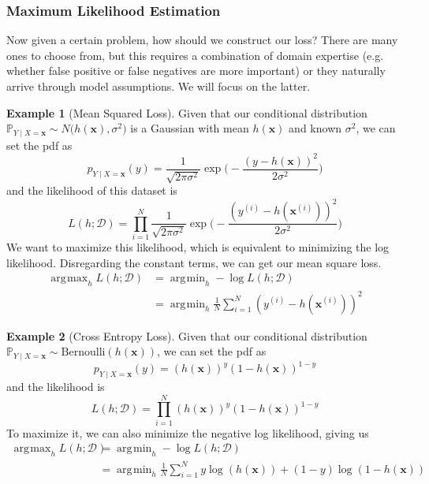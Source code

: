 \documentclass{article}
\DeclareMathOperator*{\argmin}{\arg\!\min}
\DeclareMathOperator*{\argmax}{\arg\!\max}
\theoremstyle{definition}
\newtheorem{example}{Example}[section]
\begin{document}
    \subsubsection{Maximum Likelihood Estimation}

    Now given a certain problem, how should we construct our loss? There are many ones to choose from, but this requires a combination of domain expertise (e.g. whether false positive or false negatives are more important) or they naturally arrive through model assumptions. We will focus on the latter. 

    \begin{example}[Mean Squared Loss]
      Given that our conditional distribution $\mathbb{P}_{Y \mid X = \mathbf{x}} \sim N\big( h(\mathbf{x}), \sigma^2)$ is a Gaussian with mean $h(\mathbf{x})$ and known $\sigma^2$, we can set the pdf as 
      \[p_{Y \mid X = \mathbf{x}} (y) = \frac{1}{\sqrt{2\pi \sigma^2}} \exp \bigg( -\frac{ (y - h(\mathbf{x}))^2}{2 \sigma^2} \bigg) \]
      and the likelihood of this dataset is 
      \[L(h; \mathcal{D}) = \prod_{i=1}^N \frac{1}{\sqrt{2\pi \sigma^2}} \exp \bigg( -\frac{ (y^{(i)} - h(\mathbf{x}^{(i)}))^2}{2 \sigma^2} \bigg)\]
      We want to maximize this likelihood, which is equivalent to minimizing the log likelihood. Disregarding the constant terms, we can get our mean square loss. 
      \begin{align*}
        \argmax_h L(h; \mathcal{D}) & = \argmin_h -\log L(h; \mathcal{D}) \\
        & = \argmin_h \frac{1}{N} \sum_{i=1}^N (y^{(i)} - h( \mathbf{x}^{(i)}))^2 
      \end{align*}
    \end{example}

    \begin{example}[Cross Entropy Loss]
      Given that our conditional distribution $\mathbb{P}_{Y \mid X = \mathbf{x}} \sim \mathrm{Bernoulli}(h(\mathbf{x}))$, we can set the pdf as 
        \[p_{Y \mid X = \mathbf{x}} (y) = (h(\mathbf{x}))^y (1 - h(\mathbf{x}))^{1 - y}\]
      and the likelihood is 
        \[L(h; \mathcal{D}) = \prod_{i=1}^N (h(\mathbf{x}))^y (1 - h(\mathbf{x}))^{1 - y}\]
      To maximize it, we can also minimize the negative log likelihood, giving us 
      \begin{align*}
        \argmax_h L(h; \mathcal{D}) & = \argmin_h -\log L(h; \mathcal{D}) \\
        & = \argmin_h \frac{1}{N} \sum_{i=1}^N y \log (h(\mathbf{x})) + (1 - y) \log (1 - h(\mathbf{x})) 
      \end{align*}
    \end{example}
\end{document}
